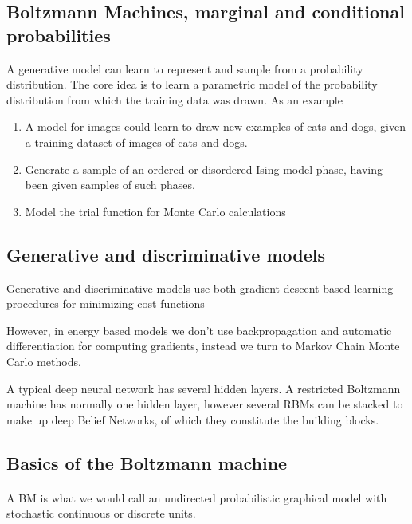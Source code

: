 \documentclass[%
oneside,                 %
final,                   %
10pt]{article}
\begin{document}
\noindent



\subsection{Boltzmann Machines, marginal and conditional probabilities}

A generative model can learn to represent and sample from a
probability distribution. The core idea is to learn a parametric model
of the probability distribution from which the training data was
drawn. As an example
\begin{enumerate}
\item A model for images could learn to draw new examples of cats and dogs, given a training dataset of images of cats and dogs.

\item Generate a sample of an ordered or disordered Ising model phase, having been given samples of such phases.

\item Model the trial function for Monte Carlo calculations
\end{enumerate}

\noindent
\subsection{Generative and discriminative models}

Generative and discriminative models use both gradient-descent based
learning procedures for minimizing cost functions

However, in energy based models we don't use backpropagation and automatic
differentiation for computing gradients, instead we turn to Markov
Chain Monte Carlo methods.

A typical deep neural network has several hidden layers. A restricted
Boltzmann machine has normally one hidden layer, however several RBMs can
be stacked to make up deep Belief Networks, of which they constitute
the building blocks.

\subsection{Basics of the Boltzmann machine}

\paragraph{}
A BM is what we would call an undirected probabilistic graphical model
with stochastic continuous or discrete units.
\end{document}
